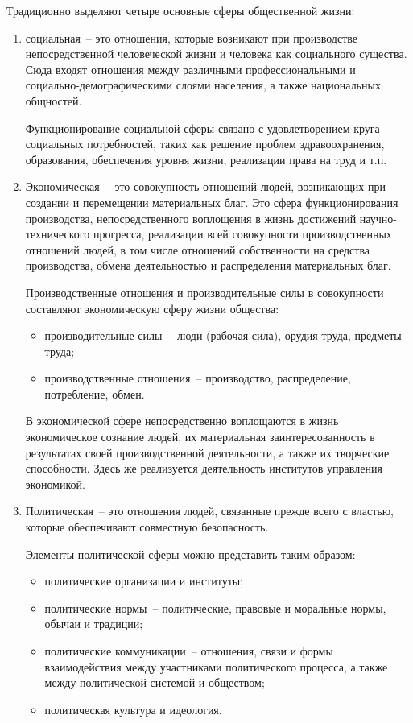 Традиционно выделяют четыре основные сферы общественной жизни:
\begin{enumerate}
    \item социальная~-- это отношения, которые возникают при производстве непосредственной
        человеческой жизни и человека как социального существа. Сюда входят отношения между
        различными профессиональными и социально-демографическими слоями населения, а также
        национальных общностей.
        
        Функционирование социальной сферы связано с удовлетворением круга социальных потребностей,
        таких как решение проблем здравоохранения, образования, обеспечения уровня жизни, реализации
        права на труд и т.п.
        
    \item Экономическая~-- это совокупность отношений людей, возникающих при создании и перемещении
        материальных благ. Это сфера функционирования производства, непосредственного воплощения в
        жизнь достижений научно-технического прогресса, реализации всей совокупности производственных
        отношений людей, в том числе отношений собственности на средства производства, обмена
        деятельностью и распределения материальных благ.
        
        Производственные отношения и производительные силы в совокупности составляют экономическую
        сферу жизни общества:
        \begin{itemize}
            \item производительные силы~-- люди (рабочая сила), орудия труда, предметы труда;
            \item производственные отношения~-- производство, распределение, потребление, обмен.
        \end{itemize}
        
        В экономической сфере непосредственно воплощаются в жизнь экономическое сознание людей, их
        материальная заинтересованность в результатах своей производственной деятельности, а также их
        творческие способности. Здесь же реализуется деятельность институтов управления экономикой.
        
    \item Политическая~-- это отношения людей, связанные прежде всего с властью, которые обеспечивают
        совместную безопасность.
        
        Элементы политической сферы можно представить таким образом:
        \begin{itemize}
            \item политические организации и институты;
            \item политические нормы~-- политические, правовые и моральные нормы, обычаи и традиции;
            \item политические коммуникации~-- отношения, связи и формы взаимодействия между
                участниками политического процесса, а также между политической системой и обществом;
            \item политическая культура и идеология.
        \end{itemize}


\end{enumerate}
